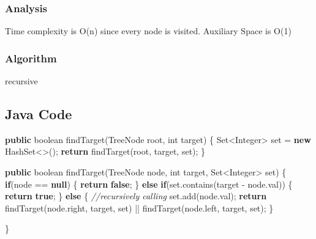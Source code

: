 \documentclass[]{book}
\newenvironment{Shaded}{\begin{snugshade}}{\end{snugshade}}
\newcommand{\KeywordTok}[1]{\textcolor[rgb]{0.13,0.29,0.53}{\textbf{#1}}}
\newcommand{\DataTypeTok}[1]{\textcolor[rgb]{0.13,0.29,0.53}{#1}}
\newcommand{\CommentTok}[1]{\textcolor[rgb]{0.56,0.35,0.01}{\textit{#1}}}
\newcommand{\FunctionTok}[1]{\textcolor[rgb]{0.00,0.00,0.00}{#1}}
\newcommand{\BuiltInTok}[1]{#1}
\newcommand{\NormalTok}[1]{#1}
\begin{document}
\subsubsection{Analysis}\label{analysis}

Time complexity is O(n) since every node is visited. Auxiliary Space is
O(1)

\subsubsection{Algorithm}\label{algorithm}

recursive

\subsection{Java Code}\label{java-code}

\begin{Shaded}
\begin{Highlighting}[]
\KeywordTok{public} \DataTypeTok{boolean} \FunctionTok{findTarget}\NormalTok{(}\BuiltInTok{TreeNode}\NormalTok{ root, }\DataTypeTok{int}\NormalTok{ target) \{}
    \BuiltInTok{Set}\NormalTok{<}\BuiltInTok{Integer}\NormalTok{> set = }\KeywordTok{new} \BuiltInTok{HashSet}\NormalTok{<>();}
    \KeywordTok{return} \FunctionTok{findTarget}\NormalTok{(root, target, set);}
\NormalTok{\}}

\KeywordTok{public} \DataTypeTok{boolean} \FunctionTok{findTarget}\NormalTok{(}\BuiltInTok{TreeNode}\NormalTok{ node, }\DataTypeTok{int}\NormalTok{ target, }\BuiltInTok{Set}\NormalTok{<}\BuiltInTok{Integer}\NormalTok{> set) \{}
    \KeywordTok{if}\NormalTok{(node == }\KeywordTok{null}\NormalTok{) \{}
        \KeywordTok{return} \KeywordTok{false}\NormalTok{;}
\NormalTok{    \} }\KeywordTok{else} \KeywordTok{if}\NormalTok{(set.}\FunctionTok{contains}\NormalTok{(target - node.}\FunctionTok{val}\NormalTok{)) \{}
        \KeywordTok{return} \KeywordTok{true}\NormalTok{;}
\NormalTok{    \} }\KeywordTok{else}\NormalTok{ \{}
        \CommentTok{//recursively calling}
\NormalTok{        set.}\FunctionTok{add}\NormalTok{(node.}\FunctionTok{val}\NormalTok{);}
        \KeywordTok{return} \FunctionTok{findTarget}\NormalTok{(node.}\FunctionTok{right}\NormalTok{, target, set) || }\FunctionTok{findTarget}\NormalTok{(node.}\FunctionTok{left}\NormalTok{, target, set);}
\NormalTok{    \}}

\NormalTok{\}}
\end{Highlighting}
\end{Shaded}
\end{document}

